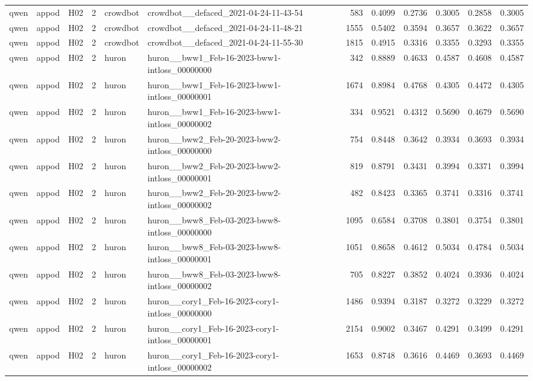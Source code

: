\begin{table}[tbp]
\begin{tabular}{lllrllrrrrrr}
qwen & appod & H02 & 2 & crowdbot & crowdbot\_\_defaced\_2021-04-24-11-43-54 & 583 & 0.4099 & 0.2736 & 0.3005 & 0.2858 & 0.3005 \\
qwen & appod & H02 & 2 & crowdbot & crowdbot\_\_defaced\_2021-04-24-11-48-21 & 1555 & 0.5402 & 0.3594 & 0.3657 & 0.3622 & 0.3657 \\
qwen & appod & H02 & 2 & crowdbot & crowdbot\_\_defaced\_2021-04-24-11-55-30 & 1815 & 0.4915 & 0.3316 & 0.3355 & 0.3293 & 0.3355 \\
qwen & appod & H02 & 2 & huron & huron\_\_bww1\_Feb-16-2023-bww1-intloss\_00000000 & 342 & 0.8889 & 0.4633 & 0.4587 & 0.4608 & 0.4587 \\
qwen & appod & H02 & 2 & huron & huron\_\_bww1\_Feb-16-2023-bww1-intloss\_00000001 & 1674 & 0.8984 & 0.4768 & 0.4305 & 0.4472 & 0.4305 \\
qwen & appod & H02 & 2 & huron & huron\_\_bww1\_Feb-16-2023-bww1-intloss\_00000002 & 334 & 0.9521 & 0.4312 & 0.5690 & 0.4679 & 0.5690 \\
qwen & appod & H02 & 2 & huron & huron\_\_bww2\_Feb-20-2023-bww2-intloss\_00000000 & 754 & 0.8448 & 0.3642 & 0.3934 & 0.3693 & 0.3934 \\
qwen & appod & H02 & 2 & huron & huron\_\_bww2\_Feb-20-2023-bww2-intloss\_00000001 & 819 & 0.8791 & 0.3431 & 0.3994 & 0.3371 & 0.3994 \\
qwen & appod & H02 & 2 & huron & huron\_\_bww2\_Feb-20-2023-bww2-intloss\_00000002 & 482 & 0.8423 & 0.3365 & 0.3741 & 0.3316 & 0.3741 \\
qwen & appod & H02 & 2 & huron & huron\_\_bww8\_Feb-03-2023-bww8-intloss\_00000000 & 1095 & 0.6584 & 0.3708 & 0.3801 & 0.3754 & 0.3801 \\
qwen & appod & H02 & 2 & huron & huron\_\_bww8\_Feb-03-2023-bww8-intloss\_00000001 & 1051 & 0.8658 & 0.4612 & 0.5034 & 0.4784 & 0.5034 \\
qwen & appod & H02 & 2 & huron & huron\_\_bww8\_Feb-03-2023-bww8-intloss\_00000002 & 705 & 0.8227 & 0.3852 & 0.4024 & 0.3936 & 0.4024 \\
qwen & appod & H02 & 2 & huron & huron\_\_cory1\_Feb-16-2023-cory1-intloss\_00000000 & 1486 & 0.9394 & 0.3187 & 0.3272 & 0.3229 & 0.3272 \\
qwen & appod & H02 & 2 & huron & huron\_\_cory1\_Feb-16-2023-cory1-intloss\_00000001 & 2154 & 0.9002 & 0.3467 & 0.4291 & 0.3499 & 0.4291 \\
qwen & appod & H02 & 2 & huron & huron\_\_cory1\_Feb-16-2023-cory1-intloss\_00000002 & 1653 & 0.8748 & 0.3616 & 0.4469 & 0.3693 & 0.4469 \\

\end{tabular}
\end{table}
